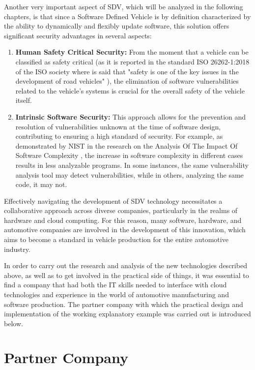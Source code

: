 Another very important aspect of SDV, which will be analyzed in the following chapters, is that since a Software Defined Vehicle is by definition characterized by the ability to dynamically and flexibly update software, this solution offers significant security advantages in several aspects:
\begin{enumerate}
  \item \textbf{Human Safety Critical Security:} From the moment that a vehicle can be classified as safety critical (as it is reported in the standard ISO 26262-1:2018 of the ISO society where is said that "safety is one of the key issues in the development of road vehicles" \cite{ISO26262}), the elimination of software vulnerabilities related to the vehicle's systems is crucial for the overall safety of the vehicle itself.  
  \item \textbf{Intrinsic Software Security:} This approach allows for the prevention and resolution of vulnerabilities unknown at the time of software design, contributing to ensuring a high standard of security. For example, as demonstrated by NIST in the research on the Analysis Of The Impact Of Software Complexity \cite{NISTCodeComplexity}, the increase in software complexity in different cases results in less analyzable programs. In some instances, the same vulnerability analysis tool may detect vulnerabilities, while in others, analyzing the same code, it may not. 
\end{enumerate}

Effectively navigating the development of SDV technology necessitates a collaborative approach across diverse companies, particularly in the realms of hardware and cloud computing. For this reason, many software, hardware, and automotive companies are involved in the development of this innovation, which aims to become a standard in vehicle production for the entire automotive industry.

In order to carry out the research and analysis of the new technologies described above, as well as to get involved in the practical side of things, it was essential to find a company that had both the IT skills needed to interface with cloud technologies and experience in the world of automotive manufacturing and software production. The partner company with which the practical design and implementation of the working explanatory example was carried out is introduced below.
\section{Partner Company}

